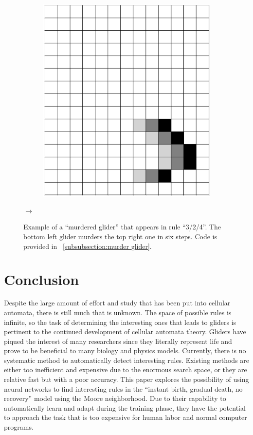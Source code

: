 \documentclass[12pt]{article}
\numberwithin{figure}{section} %
\begin{document}
\begin{figure}[H]
\begin{subfigure}{0.23\textwidth}
     	\subcaption{}
   	\end{subfigure}
	\begin{subfigure}{0.23\textwidth}
     	\includegraphics[width=\linewidth]{Section4/36.6}
     	\subcaption{}
   	\end{subfigure}
	{\LARGE$\rightarrow{}$}
   \caption[Example of a "murdered glider"]{Example of a “murdered glider” that appears in rule “3/2/4”. The bottom left glider murders the top right one in six steps. Code is provided in ~\ref{subsubsection:murder glider}.}
   \label{fig:murder glider}
\end{figure}

\newpage
\section{Conclusion}
Despite the large amount of effort and study that has been put into cellular automata, there is still much that is unknown. The space of possible rules is infinite, so the task of determining the interesting ones that leads to gliders is pertinent to the continued development of cellular automata theory. Gliders have piqued the interest of many researchers since they literally represent life and prove to be beneficial to many biology and physics models. Currently, there is no systematic method to automatically detect interesting rules. Existing methods are either too inefficient and expensive due to the enormous search space, or they are relative fast but with a poor accuracy. This paper explores the possibility of using neural networks to find interesting rules in the “instant birth, gradual death, no recovery” model using the Moore neighborhood. Due to their capability to automatically learn and adapt during the training phase, they have the potential to approach the task that is too expensive for human labor and normal computer programs. 
\end{document}
